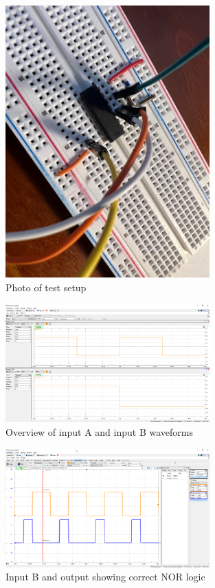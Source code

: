 \documentclass{article}
\begin{document}
	\begin{figure}[H]
	    \centering
	    \includegraphics[width=0.7\textwidth]{2c-nor-photo}
	    \caption{Photo of test setup}
	\end{figure}
	
	\begin{figure}[H]
	    \centering
	    \includegraphics[width=0.7\textwidth]{2c-setup}
	    \caption{Overview of input A and input B waveforms}
	\end{figure}
	
	\begin{figure}[H]
	    \centering
	    \includegraphics[width=0.7\textwidth]{2c-nor}
	    \caption{Input B and output showing correct NOR logic}
	\end{figure}
	
\end{document}
